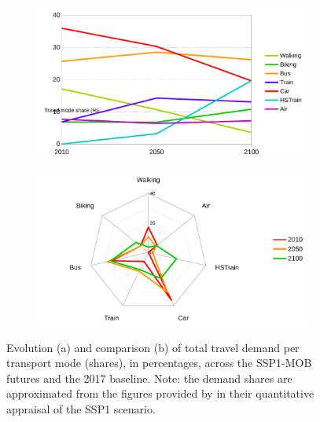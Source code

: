 \begin{figure}
		\centering
  \begin{subfigure}{0.8\textwidth}
    \includegraphics[width=\linewidth]{figures/line_travel-demand-shares.pdf}
    \caption{}
    \label{fig:results:line_travel-demand-shares}
  \end{subfigure}
  \begin{subfigure}{0.8\textwidth}
    \includegraphics[width=\linewidth]{figures/radar_travel-demand-shares.pdf}
    \caption{}
    \label{fig:results:radar_travel-demand-shares}
  \end{subfigure}
  \caption[Evolution and comparison of travel demand shares in SSP1-MOB.]{Evolution (a) and comparison (b) of total travel demand per transport mode (shares), in percentages, across the SSP1-MOB futures and the 2017 baseline. Note: the demand shares are approximated from the figures provided by \textcite{vuuren2017_Energylanduse} in their quantitative appraisal of the SSP1 scenario.}
\end{figure}